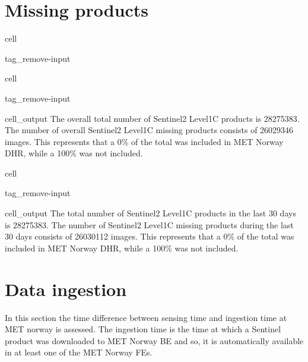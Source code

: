 \documentclass[letterpaper,10pt,english]{jupyterBook}
\begin{document}
\section{Missing products}
\label{\detokenize{S2L1C_portals:missing-products}}
\begin{sphinxuseclass}{cell}
\begin{sphinxuseclass}{tag_remove-input}
\end{sphinxuseclass}
\end{sphinxuseclass}
\begin{sphinxuseclass}{cell}
\begin{sphinxuseclass}{tag_remove-input}\begin{sphinxVerbatimOutput}

\begin{sphinxuseclass}{cell_output}
\sphinxAtStartPar
The overall total number of Sentinel\sphinxhyphen{}2 Level\sphinxhyphen{}1C products is 28275383. The number of overall Sentinel\sphinxhyphen{}2 Level\sphinxhyphen{}1C missing products consists of 26029346 images. This represents that a 0\% of the total was included in MET Norway DHR, while a 100\% was not included.

\end{sphinxuseclass}\end{sphinxVerbatimOutput}

\end{sphinxuseclass}
\end{sphinxuseclass}
\begin{sphinxuseclass}{cell}
\begin{sphinxuseclass}{tag_remove-input}\begin{sphinxVerbatimOutput}

\begin{sphinxuseclass}{cell_output}
\sphinxAtStartPar
The total number of Sentinel\sphinxhyphen{}2 Level\sphinxhyphen{}1C products in the last 30 days is 28275383. The number of Sentinel\sphinxhyphen{}2 Level\sphinxhyphen{}1C missing products during the last 30 days consists of 26030112 images. This represents that a 0\% of the total was included in MET Norway DHR, while a 100\% was not included.

\end{sphinxuseclass}\end{sphinxVerbatimOutput}

\end{sphinxuseclass}
\end{sphinxuseclass}

\section{Data ingestion}
\label{\detokenize{S2L1C_portals:data-ingestion}}
\sphinxAtStartPar
In this section the time difference between sensing time and ingestion time at MET norway is assessed. The ingestion time is the time at which a Sentinel product was downloaded to MET Norway BE and so, it is automatically available in at least one of the MET Norway FEs.
\end{document}

